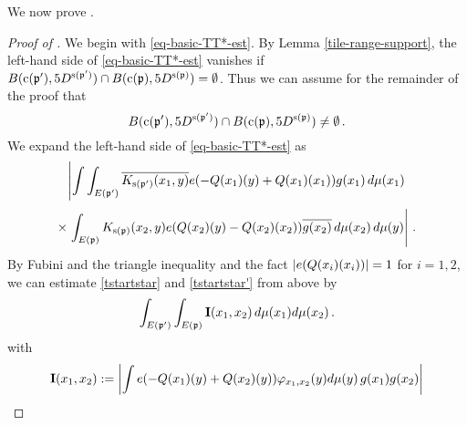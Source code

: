 We now prove .
\begin{proof}[Proof of ]
    \leanok
We begin with \eqref{eq-basic-TT*-est}.
By Lemma \ref{tile-range-support}, the left-hand side of \eqref{eq-basic-TT*-est} vanishes if
$B({\mathrm{c}}({\mathfrak p}'),5D^{{\mathrm{s}}({\mathfrak p}')}) \cap B({\mathrm{c}}({\mathfrak p}),5D^{{\mathrm{s}}({\mathfrak p})}) = \emptyset$.
Thus we can assume for the remainder of the proof that
\begin{equation}
        \label{intersec5B}
        B({\mathrm{c}}({\mathfrak p}'),5D^{{\mathrm{s}}({\mathfrak p}')}) \cap B({\mathrm{c}}({\mathfrak p}),5D^{{\mathrm{s}}({\mathfrak p})}) \neq \emptyset\,.
\end{equation}
We expand the left-hand side of \eqref{eq-basic-TT*-est} as
\begin{equation}\label{tstartstar}
\left|\int \int_{E({\mathfrak p}')} \overline{K_{{\mathrm{s}}({\mathfrak p}')}(x_1,y)}e(-{Q}(x_1)(y)+
    {Q}(x_1)(x_1))g(x_1)\, d\mu(x_1) \right.
\end{equation}
\begin{equation}\label{tstartstar'}
 \times \left.\int_{E({\mathfrak p})} {K_{{\mathrm{s}}({\mathfrak p})}(x_2,y)}e({Q}(x_2)(y)
    -{Q}(x_2)(x_2))\overline{g(x_2)}\, d\mu(x_2)\, d\mu(y)\right|\, .
\end{equation}
By Fubini and the triangle inequality and
the fact $|e({Q}(x_i)(x_i))|=1$ for $i=1,2$, we can estimate
\eqref{tstartstar} and \eqref{tstartstar'} from above by
\begin{equation}\label{eqa1}
    \int_{E({\mathfrak p}')} \int_{E({\mathfrak p})} {\bf I}(x_1, x_2)\, d\mu(x_1)d\mu(x_2)\,.
\end{equation}
with
\begin{equation}
    {\bf I}(x_1, x_2):=
    \left|\int
    e(-{Q}(x_1)(y)+{Q}(x_2)(y))\varphi_{x_1,x_2}(y)
    d\mu(y) \, g(x_1)g(x_2)\right|
\end{equation}



\end{proof}
